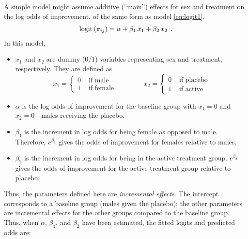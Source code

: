 A simple model might assume additive (``main'') effects
for sex and treatment on the log odds of improvement,
of the same form as model \eqref{eq:logit1}.
\begin{equation} \label{eq:logst}
  \logit \,  ( \pi_{ij} ) = \alpha   +
  \beta _1 \,  x_1  +
  \beta _2 \,  x_2
  \period
\end{equation}
In this model,
\begin{itemize}

\item \(x_1\) and \(x_2\) are dummy (0/1) variables representing sex and
       treatment, respectively.  They are defined as 
\begin{equation*}
 x_1 = \left\{
    \begin{array}{ll}
    0  & \mbox{ if male} \\
    1  & \mbox{ if female}
    \end{array}
    \right.
 \qquad\qquad
 x_2 = \left\{
    \begin{array}{ll}
    0  & \mbox{ if placebo} \\
    1  & \mbox{ if active}
    \end{array}
    \right.
\end{equation*}
\item \(\alpha\) is the log odds of improvement for the baseline group
with $x_1=0$ and $x_2=0$---males receiving
the placebo.

\item \(\beta_1\) is the increment in log odds for being female
as opposed to male.
Therefore, \(e^{ \beta_1 }\) gives the odds of improvement
for females relative to males.

\item \(\beta_2\) is the increment in log odds for being in the
active treatment group.  \(e^{ \beta_2 }\) gives the odds of
improvement for the active treatment group relative to
placebo.

\end{itemize}

Thus, the parameters defined here are \emph{incremental effects}.  The
intercept corresponds to a baseline group (males given the placebo);
the other parameters are incremental effects for the other groups
compared to the baseline group.
Thus, when \(\alpha\), \(\beta _1\), and \(\beta _2\) have
been estimated, the fitted logits and predicted odds are:

